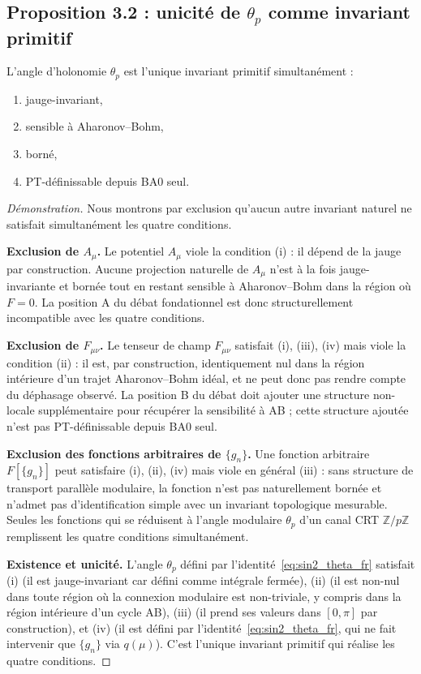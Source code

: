\subsection{Proposition 3.2 : unicité de $\theta_p$ comme invariant primitif}
\label{ssec:prop_3_2}

\begin{proposition}
\label{prop:theta_p_unique}
L'angle d'holonomie $\theta_p$ est l'unique invariant primitif
simultanément :
\begin{enumerate}[label=(\roman*),nosep]
  \item jauge-invariant,
  \item sensible à Aharonov--Bohm,
  \item borné,
  \item PT-définissable depuis BA0 seul.
\end{enumerate}
\end{proposition}

\begin{proof}[Démonstration]
Nous montrons par exclusion qu'aucun autre invariant naturel ne
satisfait simultanément les quatre conditions.

\textbf{Exclusion de $A_\mu$.}
Le potentiel $A_\mu$ viole la condition (i) : il dépend de la
jauge par construction. Aucune projection naturelle de $A_\mu$
n'est à la fois jauge-invariante et bornée tout en restant
sensible à Aharonov--Bohm dans la région où $F = 0$. La position
A du débat fondationnel est donc structurellement incompatible
avec les quatre conditions.

\textbf{Exclusion de $F_{\mu\nu}$.}
Le tenseur de champ $F_{\mu\nu}$ satisfait (i), (iii), (iv) mais
viole la condition (ii) : il est, par construction, identiquement
nul dans la région intérieure d'un trajet Aharonov--Bohm idéal,
et ne peut donc pas rendre compte du déphasage observé. La
position B du débat doit ajouter une structure non-locale
supplémentaire pour récupérer la sensibilité à AB ; cette
structure ajoutée n'est pas PT-définissable depuis BA0 seul.

\textbf{Exclusion des fonctions arbitraires de $\{g_n\}$.}
Une fonction arbitraire $F[\{g_n\}]$ peut satisfaire (i), (ii),
(iv) mais viole en général (iii) : sans structure de transport
parallèle modulaire, la fonction n'est pas naturellement bornée
et n'admet pas d'identification simple avec un invariant
topologique mesurable. Seules les fonctions qui se réduisent à
l'angle modulaire $\theta_p$ d'un canal CRT
$\mathbb{Z}/p\mathbb{Z}$ remplissent les quatre conditions
simultanément.

\textbf{Existence et unicité.}
L'angle $\theta_p$ défini par
l'identité~\eqref{eq:sin2_theta_fr} satisfait (i) (il est
jauge-invariant car défini comme intégrale fermée), (ii) (il est
non-nul dans toute région où la connexion modulaire est
non-triviale, y compris dans la région intérieure d'un cycle
AB), (iii) (il prend ses valeurs dans $[0, \pi]$ par
construction), et (iv) (il est défini par
l'identité~\eqref{eq:sin2_theta_fr}, qui ne fait intervenir que
$\{g_n\}$ via $q(\mu)$). C'est l'unique invariant primitif qui
réalise les quatre conditions.
\end{proof}

